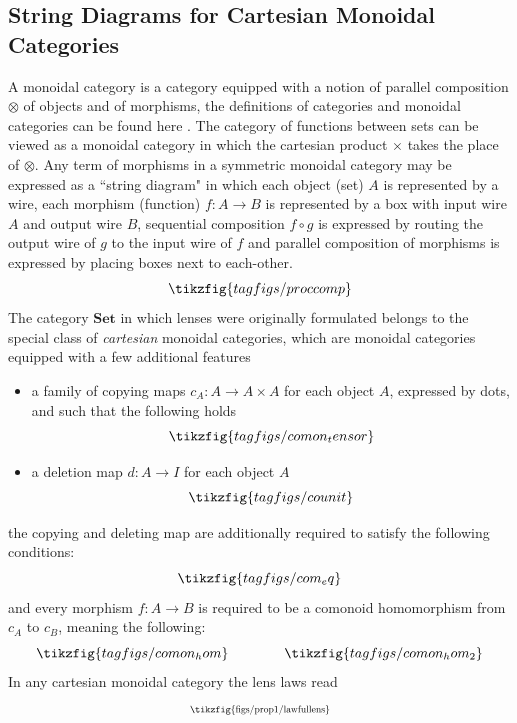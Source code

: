 \documentclass[a4paper,11pt]{article}
\newcommand{\tikzfigscale}[2]{\scalebox{#1}{\tikzfig{#2}}}
\theoremstyle{definition}
\theoremstyle{plain}
\theoremstyle{plain}
\theoremstyle{definition}
\begin{document}
\subsection{String Diagrams for Cartesian Monoidal Categories}
A monoidal category is a category equipped with a notion of parallel composition $\otimes$ of objects and of morphisms, the definitions of categories and monoidal categories can be found here \cite{maclane:71}. The category of functions between sets can be viewed as a monoidal category in which the cartesian product $\times$ takes the place of $\otimes$. Any term of morphisms in a symmetric monoidal category may be expressed as a ``string diagram" in which each object (set) $A$ is represented by a wire, each morphism (function) $f:A \rightarrow B$ is represented by a box with input wire $A$ and output wire $B$, sequential composition $f \circ g$ is expressed by routing the output wire of $g$ to the input wire of $f$ and parallel composition of morphisms is expressed by placing boxes next to each-other.
\[\tikzfig{tagfigs/proccomp}\]
The category $\mathbf{Set}$ in which lenses were originally formulated belongs to the special class of \textit{cartesian} monoidal categories, which are monoidal categories equipped with a few additional features \cite{heunen2019categories}
\begin{itemize}
    \item a family of copying maps $c_A: A \rightarrow A \times A$ for each object $A$, expressed by dots, and such that the following holds \[\tikzfig{tagfigs/comon_tensor}\]
    \item a deletion map $d:A \rightarrow I$ for each object $A$ \[\tikzfig{tagfigs/counit}\]
\end{itemize}
the copying and deleting map are additionally required to satisfy the following conditions:
\[\tikzfig{tagfigs/com_eq}\]
and every morphism $f:A \rightarrow B$ is required to be a comonoid homomorphism from $c_A$ to $c_B$, meaning the following:
\[\tikzfig{tagfigs/comon_hom} \quad \quad \quad \quad \tikzfig{tagfigs/comon_hom_2}\]
In any cartesian monoidal category the lens laws read \cite{Riley2018CategoriesOO}
\begin{equation*}
    \tikzfigscale{0.7}{figs/prop1/lawfullens}
\end{equation*}
\end{document}
